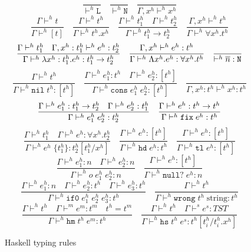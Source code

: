 \begin{figure}[p]
\[
\frac{}{\vdash^h\mathtt{L}}
\quad
\frac{}{\vdash^h\mathtt{N}}
\quad
\frac{}{\Gamma,x^h\vdash^hx^h}
\]
\[
\frac{\Gamma\vdash^ht}{\Gamma\vdash^h[t]}
\quad
\frac{\Gamma\vdash^ht^h}{\Gamma\vdash^ht^h.x^h}
\quad
\frac{\Gamma\vdash^ht^h_1\quad\Gamma\vdash^ht^h_2}{\Gamma\vdash^ht^h_1\rightarrow t^h_2}
\quad
\frac{\Gamma,x^h\vdash^ht^h}{\Gamma\vdash^h\forall x^h.t^h}
\]
\bigskip
\[
\frac{\Gamma\vdash^ht^h_1\quad\Gamma,x^h:t^h_1\vdash^he^{h}:t^h_2}{\Gamma\vdash^h\lambda x^h:t^h_1.e^h:t^h_1\rightarrow t^{h}_{2}}
\quad
\frac{\Gamma,x^h\vdash^he^h:t^h}{\Gamma\vdash^h\Lambda x^h.e^h:\forall x^h.t^h}
\quad
\frac{}{\vdash^h\overline{n}:\mathtt{N}}
\]
\[
\frac{\Gamma\vdash^ht^h}{\Gamma\vdash^h\mathtt{nil}\;t^h:[t^h]}
\quad
\frac{\Gamma\vdash^he^h_1:t^h\quad\Gamma\vdash^he^h_2:[t^h]}{\Gamma\vdash^h\mathtt{cons}\;e^h_1\;e^h_2:[t^h]}
\quad
\frac{}{\Gamma,x^h:t^h\vdash^hx^h:t^h}
\]
\[
\frac{\Gamma\vdash^he^h_1:t^h_1\rightarrow t^h_2\quad\Gamma\vdash^he^h_2:t^h_1}{\Gamma\vdash^he^{h}_{1} \; e^{h}_{2}:t^h_2}
\quad
\frac{\Gamma\vdash^he^h:t^h\rightarrow t^h}{\Gamma\vdash^h\mathtt{fix}\;e^h:t^h}
\]
\[
\frac{\Gamma\vdash^ht^h_1\quad\Gamma\vdash^he^h:\forall x^h.t^h_2}{\Gamma\vdash^he^h\;\lbrace t^h_1\rbrace:t^h_2[t^h_1/x^h]}
\quad
\frac{\Gamma\vdash^he^h:[t^h]}{\Gamma\vdash^h\mathtt{hd}\;e^h:t^h}
\quad
\frac{\Gamma\vdash^he^h:[t^h]}{\Gamma\vdash^h\mathtt{tl}\;e^h:[t^h]}
\]
\[
\frac{\Gamma\vdash^he^h_1:n\quad\Gamma\vdash^he^h_2:n}{\Gamma\vdash^ho\;e^h_1\;e^h_2:n}
\quad
\frac{\Gamma\vdash^he^h:[t^h]}{\Gamma\vdash^h\mathtt{null?}\;e^h:n}
\]
\[
\frac{\Gamma\vdash^he^h_1:n\quad\Gamma\vdash^he^h_2:t^h\quad\Gamma\vdash^he^h_3:t^h}{\Gamma\vdash^h\mathtt{if0}\;e^h_1\;e^h_2\;e^h_3:t^h}
\quad
\frac{\Gamma\vdash^ht^h}{\Gamma\vdash^h\mathtt{wrong}\;t^h\;\mathrm{string}:t^h}
\]
\[
\frac{\Gamma\vdash^ht^h\quad\Gamma\vdash^me^m:t^m\quad t^h=t^m}{\Gamma\vdash^h\mathtt{hm}\;t^h\;e^m:t^h}
\quad
\frac{\Gamma\vdash^ht^h\quad\Gamma\vdash^se^s:TST}{\Gamma\vdash^h\mathtt{hs}\;t^h\;e^s:t^h[t^h_i/t^h_i.x^h]}
\]
\caption{Haskell typing rules}
\label{htr}
\end{figure}